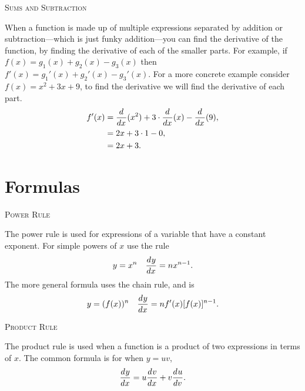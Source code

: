 \documentclass[a4paper,10pt]{article}
\newcommand{\deriv}[3][ ]{\ensuremath\frac{d^{#1}#2}{d#3^{#1}}}
\newcommand{\derivof}[2][ ]{\ensuremath\frac{d^{#1}}{d#2^{#1}}}
\begin{document}
\begin{multicols*}{2}
{\large\rule{0em}{1.5em}\textsc{Sums and Subtraction}}

When a function is made up of multiple expressions separated by 
addition or subtraction---which is just funky addition---you can 
find the derivative of the function, by finding the derivative of 
each of the smaller parts. For example, if $f(x) = g_1(x) + g_2(x) - g_3(x)$
then $f'(x) = g_1'(x) + g_2'(x) - g_3'(x)$. For a more concrete example 
consider $f(x) = x^2 + 3x + 9$, to find the derivative we will 
find the derivative of each part.
\begin{align*}
f'(x) &= \derivof{x}(x^2) + 3\cdot\derivof{x}(x) - \derivof{x}(9), \\
&= 2x + 3\cdot 1 - 0, \\
&= 2x + 3.
\end{align*}

\end{multicols*}

\newpage
\section*{Formulas}
\begin{multicols*}{2}
{\large\textsc{Power Rule}}

The power rule is used for expressions of a variable that have a constant 
exponent. For simple powers of $x$ use the rule 
$$y = x^n \quad \deriv{y}{x} = nx^{n-1}.$$
The more general formula uses the chain rule, and is
$$y = (f(x))^n \quad \deriv{y}{x} = nf'(x)[f(x)]^{n-1}.$$

{\large\textsc{Product Rule}}

The product rule is used when a function is a product of two expressions 
in terms of $x$. The common formula is for when $y = uv$,
$$\deriv{y}{x} = u\deriv{v}{x} + v\deriv{u}{v}.$$
\end{multicols*}
\end{document}
